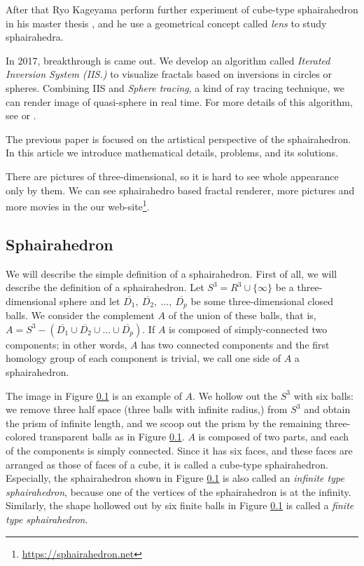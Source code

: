 \documentclass[dvipdfmx]{interact}
\theoremstyle{plain}%
\theoremstyle{definition}
\theoremstyle{remark}
\theoremstyle{problemstyle}
\begin{document}
After that Ryo Kageyama perform further experiment of
cube-type sphairahedron in his master thesis \cite{kageyama}, and he use
a geometrical concept called \textit{lens} to study sphairahedra. 

In 2017, breakthrough is came out. We develop an algorithm called
\textit{Iterated Inversion System (IIS.)} to visualize fractals based on
inversions in circles or spheres.
Combining IIS and \textit{Sphere tracing}, a kind of ray tracing
technique, we can render image of quasi-sphere in real time.
For more details of this algorithm, see
\cite{bridges2016} or \cite{bridges2017}.

The previous paper \cite{bridges2018} is focused on the artistical
perspective of the sphairahedron.
In this article we introduce mathematical details,
problems, and its solutions. 

There are pictures of three-dimensional, so it is hard to see whole
appearance only by them. We can see sphairahedro based fractal renderer,
 more pictures and more movies in the
our web-site\footnote{\url{https://sphairahedron.net}}.
\subsection{Sphairahedron}

We will describe the simple definition of a sphairahedron. 
First of all, we will describe the definition of a sphairahedron.
Let $S^3 = R^3 \cup \{\infty\}$ be a three-dimensional sphere and let
$\overline{D_1},~\overline{D_2},~...,~\overline{D_p}$ be some
three-dimensional closed balls.
We consider the complement $A$ of the union of these balls, that is,
$A = S^3 - (\overline{D_1} \cup \overline{D_2} \cup ... \cup \overline{D_p})$.
If $A$ is composed of simply-connected two components;
in other words, $A$ has two connected components and the first homology
group of each component is trivial, we call one side of $A$
a sphairahedron.

The image in Figure \ref{}\subref{}
is an example of $A$.
We hollow out the $S^3$ with six balls: we remove three half space
(three balls with infinite radius,) from $S^3$ and obtain the prism of
infinite length, and we scoop out the prism by the remaining
three-colored transparent balls as in Figure \ref{}\subref{}.
$A$ is composed of two parts, and each of the components is simply connected.
Since it has six faces, and these faces are arranged as those of faces of
a cube, it is called a cube-type sphairahedron.
Especially, the sphairahedron shown in Figure \ref{}\subref{}
is also called an \textit{infinite type sphairahedron},
because one of the vertices of the sphairahedron is at the infinity.
Similarly, the shape hollowed out by six finite balls in Figure
\ref{}\subref{} is called a
\textit{finite type sphairahedron}.
\end{document}
